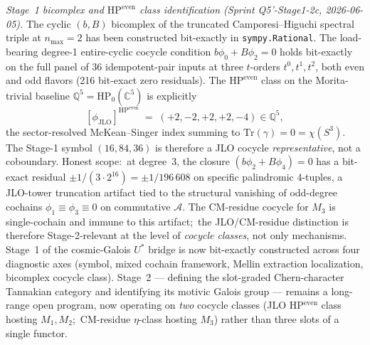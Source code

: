 \documentclass[11pt,a4paper]{article}
\theoremstyle{plain}
\theoremstyle{definition}
\newcommand{\C}{\mathbb{C}}
\newcommand{\Q}{\mathbb{Q}}
\begin{document}
\emph{Stage~1 bicomplex and $\mathrm{HP}^{\mathrm{even}}$ class
identification (Sprint Q5'-Stage1-2c, 2026-06-05).}  The cyclic
$(b, B)$ bicomplex of the truncated Camporesi--Higuchi spectral
triple at $n_{\max} = 2$ has been constructed bit-exactly in
\texttt{sympy.Rational}.  The load-bearing degree-1 entire-cyclic
cocycle condition $b\phi_0 + B\phi_2 = 0$ holds bit-exactly on the
full panel of $36$ idempotent-pair inputs at three $t$-orders
$t^0, t^1, t^2$, both even and odd flavors (216 bit-exact zero
residuals).  The $\mathrm{HP}^{\mathrm{even}}$ class on the
Morita-trivial baseline $\Q^5 = \mathrm{HP}_0(\C^5)$ is explicitly
\[
   [\phi_{\mathrm{JLO}}]^{\mathrm{HP}^{\mathrm{even}}}
   \;=\; (+2, -2, +2, +2, -4) \in \Q^5,
\]
the sector-resolved McKean--Singer index summing to
$\mathrm{Tr}(\gamma) = 0 = \chi(S^3)$.  The Stage-1 symbol
$(16, 84, 36)$ is therefore a JLO cocycle \emph{representative},
not a coboundary.  Honest scope:\ at degree~3, the closure
$(b\phi_2 + B\phi_4) = 0$ has a bit-exact residual
$\pm 1/(3 \cdot 2^{16}) = \pm 1/196\,608$ on specific palindromic
$4$-tuples, a JLO-tower truncation artifact tied to the structural
vanishing of odd-degree cochains $\phi_1 \equiv \phi_3 \equiv 0$
on commutative $\mathcal{A}$.  The CM-residue cocycle for $M_3$ is
single-cochain and immune to this artifact;\ the JLO/CM-residue
distinction is therefore Stage-2-relevant at the level of
\emph{cocycle classes}, not only mechanisms.  Stage~1 of the
cosmic-Galois $U^*$ bridge is now bit-exactly constructed across
four diagnostic axes (symbol, mixed cochain framework, Mellin
extraction localization, bicomplex cocycle class).  Stage~2 ---
defining the slot-graded Chern-character Tannakian category and
identifying its motivic Galois group --- remains a long-range open program, now
operating on \emph{two} cocycle classes (JLO HP$^{\mathrm{even}}$
class hosting $M_1, M_2$;\ CM-residue $\eta$-class hosting $M_3$)
rather than three slots of a single functor.
\end{document}
